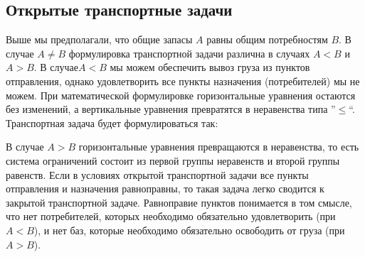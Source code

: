 \subsection{Открытые транспортные задачи}
Выше мы предполагали, что общие запасы $A$ равны общим потребностям $B$. В случае $A\neq B$  формулировка транспортной задачи различна  в  случаях $A<B$ и $A>B$. В случае$A<B$ мы можем обеспечить вывоз груза из пунктов отправления, однако удовлетворить все пункты назначения (потребителей) мы не можем. При  математической формулировке горизонтальные уравнения остаются без изменений, а вертикальные уравнения  превратятся в неравенства типа ''$\leq$``. Транспортная задача будет формулироваться так:

В случае $A>B$ горизонтальные уравнения превращаются в неравенства, то есть система ограничений  состоит из первой группы неравенств и второй группы равенств. Если в условиях открытой транспортной задачи все пункты отправления и назначения равноправны, то такая задача легко сводится к закрытой транспортной задаче. Равноправие пунктов понимается в том смысле, что нет потребителей, которых  необходимо  обязательно удовлетворить (при $A<B$), и нет баз, которые необходимо  обязательно  освободить  от груза (при $A>B$).

